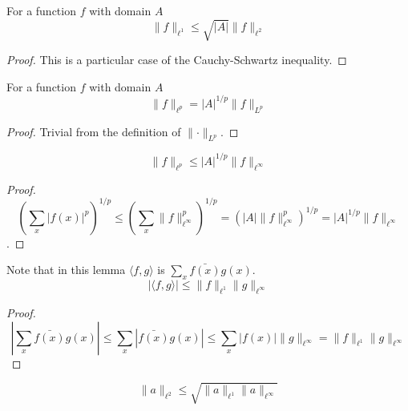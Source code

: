 \begin{theorem}
    \label{l1Norm_le_sqrt_card_mul_l2Norm}
    \leanok
    For a function $f$ with domain $A$
    $$\lVert f \rVert_{\ell^1} \leq \sqrt{|A|} \lVert f \rVert_{\ell^2}$$
\end{theorem}

\begin{proof}
    \leanok
    This is a particular case of the Cauchy-Schwartz inequality.
\end{proof}


\begin{lemma}
    \label{lpNorm_eq_card_rpow_mul_nlpNorm}
    \leanok
    For a function $f$ with domain $A$
    $$\lVert f \rVert_{\ell^p} = |A|^{1/p} \lVert f \rVert_{L^p}$$
\end{lemma}

\begin{proof}
    \leanok
    Trivial from the definition of $\lVert \cdot \rVert_{L^p}$.
\end{proof}

\begin{lemma}
    \label{lpNorm_le_card_rpow_mul_linftyNorm}
    \leanok
    $$\lVert f \rVert_{\ell^p} \leq |A|^{1/p} \lVert f \rVert_{\ell^\infty}$$
\end{lemma}

\begin{proof}
    \leanok
    $$(\sum_{x} |f(x)|^p)^{1/p} \leq (\sum_{x} \lVert f \rVert_{\ell^\infty}^p)^{1/p} = (|A| \lVert f \rVert_{\ell^\infty}^p)^{1/p} =
    |A|^{1/p} \lVert f \rVert_{\ell^\infty}$$.
\end{proof}

\begin{lemma}
    \label{l2Inner_le_l1Norm_mul_linftyNorm}
    \leanok
    Note that in this lemma $\langle f, g \rangle$ is $\sum_x \bar{f(x)} {g(x)}$.
    $$|\langle f, g \rangle| \leq \lVert f \rVert_{\ell^1} \lVert g \rVert_{\ell^\infty}$$
\end{lemma}

\begin{proof}
    \leanok
    $$|\sum_x \bar{f(x)} {g(x)}| \leq \sum_x |\bar{f(x)} {g(x)}| \leq \sum_x |f(x)| \lVert g \rVert_{\ell^\infty} =
    \lVert f \rVert_{\ell^1} \lVert g \rVert_{\ell^\infty}$$
\end{proof}

\begin{lemma}
    \label{l2Norm_le_sqrt_l1Norm_mul_linftyNorm}
    \leanok
    $$\lVert a \rVert_{\ell^2} \leq \sqrt{\lVert a \rVert_{\ell^1} \lVert a \rVert_{\ell^\infty}}$$
\end{lemma}

